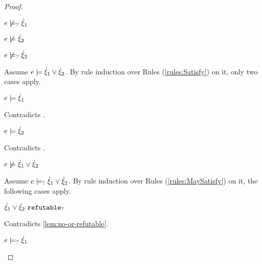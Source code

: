 \begin{proof}
\begin{byCases}
\begin{byCases}
\begin{pfsteps*}
        \item $e \not\models_{?} \dot{\xi}_1$  
        \item $e \not\models \dot{\xi}_2$  
        \item $e \not\models_{?} \dot{\xi}_2$  
        \end{pfsteps*}
        Assume $e \models \dot{\xi}_1 \vee \dot{\xi}_2$. By rule induction over Rules (\ref{rules:Satisfy}) on it, only two cases apply.
        \begin{byCases}
        \item[\text{(\ref{rule:CSOr1})}]
            \begin{pfsteps*}
            \item $e \models \dot{\xi}_1$ 
            \end{pfsteps*}
            Contradicts .
        \item[\text{(\ref{rule:CSOr2})}]
            \begin{pfsteps*}
            \item $e \models \dot{\xi}_2$ 
            \end{pfsteps*}
            Contradicts .
        \end{byCases}
        \begin{pfsteps*}
        \item $e \not\models \dot{\xi}_1 \vee \dot{\xi}_2$  
        \end{pfsteps*}
        Assume $e \models_{?} \dot{\xi}_1 \vee \dot{\xi}_2$. By rule induction over Rules (\ref{rules:MaySatisfy}) on it, the following cases apply.
        \begin{byCases}
        \item[\text{(\ref{rule:CMSNotIntro})}]
            \begin{pfsteps*}
            \item $\dot{\xi}_1 \vee \dot{\xi}_2 ~\mathtt{refutable}_?$ 
            \end{pfsteps*}
            Contradicts \autoref{lem:no-or-refutable}.
        \item[\text{(\ref{rule:CMSOr1})}]
            \begin{pfsteps*}
            \item $e \models_{?} \dot{\xi}_1$ 

\end{pfsteps*}
\end{byCases}
\end{byCases}
\end{byCases}
\end{proof}
